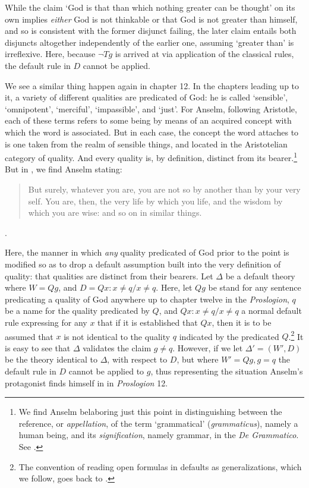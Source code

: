 \documentclass[]{amsart}
\begin{document}
While the claim `God is that than which nothing greater can be thought' on its own implies \textit{either} God is not thinkable or that God is not greater than himself, and so is consistent with the former disjunct failing, the later claim entails both disjuncts altogether independently of the earlier one, assuming `greater than' is irreflexive. Here, because $\neg Tg$ is arrived at via application of the classical rules, the default rule in $D$ cannot be applied.

We see a similar thing happen again in chapter 12. In the chapters leading up to it, a variety of different qualities are predicated of God: he is called `sensible', `omnipotent', `merciful', `impassible', and `just'. For Anselm, following Aristotle, each of these terms refers to some being by means of an acquired concept with which the word is associated. But in each case, the concept the word attaches to is one taken from the realm of sensible things, and located in the Aristotelian category of quality. And every quality is, by definition, distinct from its bearer.\footnote{We find Anselm belaboring just this point in distinguishing between the reference, or \textit{appellation}, of the term `grammatical' (\textit{grammaticus}), namely a human being, and its \textit{signification}, namely grammar, in the \textit{De Grammatico}. See \cite[DG ch. 12]{Anselm1974}.} But in \cite[Pros. 12]{AnselmPros}, we find Anselm stating:
\begin{quote}
But surely, whatever you are, you are not so by another than by your very self. You are, then, the very life by which you life, and the wisdom by which you are wise: and so on in similar things.
\end{quote}.

Here, the manner in which \textit{any} quality predicated of God prior to the point is modified so as to drop a default assumption built into the very definition of quality: that qualities are distinct from their bearers. Let $\Delta$ be a default theory where $W = {Qg}$, and $D = {Qx: x \ne q/ x \ne q}$. Here, let $Qg$ be stand for any sentence predicating a quality of God anywhere up to chapter twelve in the \textit{Proslogion}, $q$ be a name for the quality predicated by $Q$, and $Qx: x \ne q/ x \ne q$ a normal default rule expressing for any $x$ that if it is established that $Qx$, then it is to be assumed that $x$ is not identical to the quality $q$ indicated by the predicated $Q$.\footnote{The convention of reading open formulas in defaults as generalizations, which we follow, goes back to \cite{Reiter1980}.} It is easy to see that $\Delta$ validates the claim $g \ne q$. However, if we let $\Delta' = (W', D)$ be the theory identical to $\Delta$, with respect to $D$, but where $W' = {Qg, g = q}$ the default rule in $D$ cannot be applied to $g$, thus representing the situation Anselm's protagonist finds himself in in \textit{Proslogion} 12.
\end{document}
